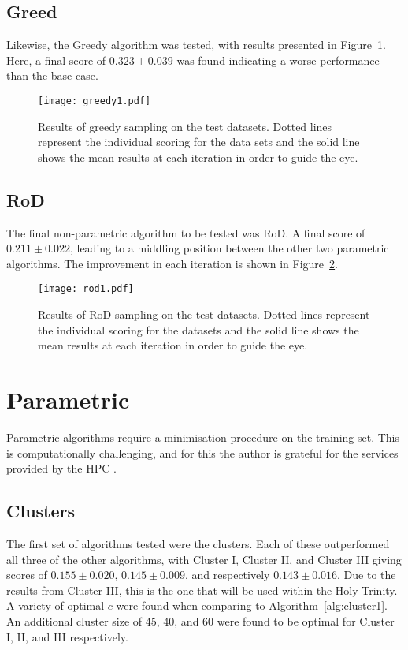 \subsection{Greed}
Likewise, the Greedy algorithm was tested, with results presented in Figure~\ref{fig:GreedyTestSet}. Here, a final score of ${0.323\pm{}0.039}$ was found indicating a worse performance than the base case.

\begin{figure}[H]
    \begin{center}
        \texttt{[image: greedy1.pdf]}
        \caption[Greedy]{Results of greedy sampling on the test datasets. Dotted lines represent the individual scoring for the data sets and the solid line shows the mean results at each iteration in order to guide the eye.}
        \label{fig:GreedyTestSet}
    \end{center}
\end{figure}

\subsection[Region of Disagreement]{RoD}
The final non-parametric algorithm to be tested was RoD. A final score of ${0.211\pm{}0.022}$, leading to a middling position between the other two parametric algorithms. The improvement in each iteration is shown in Figure~\ref{fig:RODTestSet}.

\begin{figure}[H]
    \begin{center}
        \texttt{[image: rod1.pdf]}
        \caption[RoD]{Results of RoD sampling on the test datasets. Dotted lines represent the individual scoring for the datasets and the solid line shows the mean results at each iteration in order to guide the eye.}
        \label{fig:RODTestSet}
    \end{center}
\end{figure}

\section{Parametric}
Parametric algorithms require a minimisation procedure on the training set. This is computationally challenging, and for this the author is grateful for the services provided by the HPC \cite{HPC}.

\subsection{Clusters}
The first set of algorithms tested were the clusters. Each of these outperformed all three of the other algorithms, with Cluster I, Cluster II, and Cluster III giving scores of ${0.155\pm{}0.020}$, ${0.145\pm{}0.009}$, and respectively ${0.143\pm{}0.016}$. Due to the results from Cluster III, this is the one that will be used within the Holy Trinity. A variety of optimal ${c}$ were found when comparing to Algorithm~\ref{alg:cluster1}. An additional cluster size of 45, 40, and 60 were found to be optimal for Cluster I, II, and III respectively.

